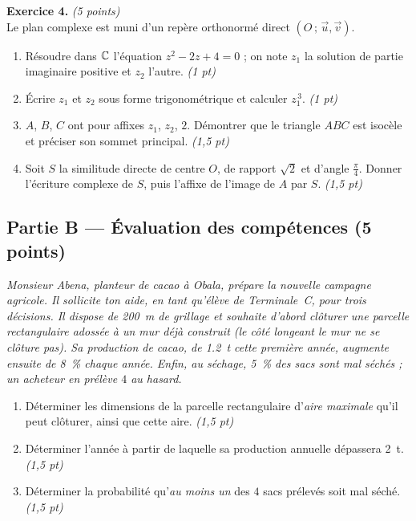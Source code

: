\smallskip
\noindent\textbf{Exercice 4.} \hfill\textit{(5 points)}\\
Le plan complexe est muni d'un repère orthonormé direct $(O\,;\,\vec u,\vec v)$.
\begin{enumerate}[label=\arabic*)]
\item Résoudre dans $\mathbb{C}$ l'équation $z^2-2z+4=0$ ; on note $z_1$ la solution de partie
imaginaire positive et $z_2$ l'autre. \hfill\textit{(1 pt)}
\item Écrire $z_1$ et $z_2$ sous forme trigonométrique et calculer $z_1^{\,3}$. \hfill\textit{(1 pt)}
\item $A$, $B$, $C$ ont pour affixes $z_1$, $z_2$, $2$. Démontrer que le triangle $ABC$
est isocèle et préciser son sommet principal. \hfill\textit{(1,5 pt)}
\item Soit $S$ la similitude directe de centre $O$, de rapport $\sqrt2$ et d'angle $\frac\pi4$.
Donner l'écriture complexe de $S$, puis l'affixe de l'image de $A$ par $S$. \hfill\textit{(1,5 pt)}
\end{enumerate}

\subsection*{Partie B — Évaluation des compétences \hfill (5 points)}

\noindent\textit{Monsieur Abena, planteur de cacao à Obala, prépare la nouvelle campagne
agricole. Il sollicite ton aide, en tant qu'élève de Terminale~C, pour trois décisions.
Il dispose de \SI{200}{\metre} de grillage et souhaite d'abord clôturer une parcelle
rectangulaire \emph{adossée à un mur} déjà construit (le côté longeant le mur ne se
clôture pas). Sa production de cacao, de \SI{1,2}{\tonne} cette première année, augmente
ensuite de \SI{8}{\percent} chaque année. Enfin, au séchage, \SI{5}{\percent} des sacs
sont mal séchés ; un acheteur en prélève $4$ au hasard.}

\begin{enumerate}[label=\textbf{Tâche \arabic*.},leftmargin=2.4em]
\item Déterminer les dimensions de la parcelle rectangulaire d'\emph{aire maximale} qu'il
peut clôturer, ainsi que cette aire. \hfill\textit{(1,5 pt)}
\item Déterminer l'année à partir de laquelle sa production annuelle dépassera \SI{2}{\tonne}. \hfill\textit{(1,5 pt)}
\item Déterminer la probabilité qu'\emph{au moins un} des $4$ sacs prélevés soit mal séché. \hfill\textit{(1,5 pt)}
\end{enumerate}
\par{}

